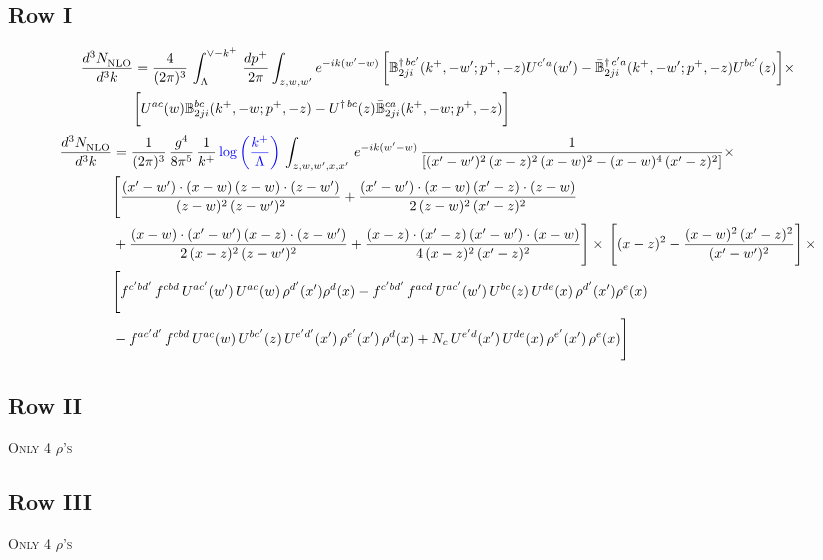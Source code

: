 \documentclass[9pt]{article}
\def\mf#1{\mathbb{#1}}
\numberwithin{equation}{section}
\begin{document}
\subsection{Row I}
\begin{align}
    \frac{d^{3}N_{\rm NLO}^{\rm}}{d^{3}k}  & = \frac{4}{(2\pi)^{3}}\,\int_{\Lambda}^{\vee-k^{+}}\, \frac{dp^{+}}{2\pi}\int_{z,w,w^{\prime}} e^{-ik(w^{\prime}-w)}\, \bigg[\mf{B}^{\dagger\, bc^{\prime}}_{2ji}(k^{+},-w^{\prime};p^{+},-z)U^{ c^{\prime}a}(w^{\prime}) -\Bar{\mf{B}}^{\dagger\, c^{\prime}a}_{2ji}(k^{+},-w^{\prime}; p^{+},-z)U^{bc^{\prime}}(z)\bigg]\times\notag \\ & \bigg[U^{ac}(w) \mf{B}^{bc}_{2ji}(k^{+},-w;p^{+},-z) -U^{\dagger\, bc}(z)\Bar{\mf{B}}^{ca}_{2ji}(k^{+},-w; p^{+},-z)\bigg]\nonumber
\end{align}
\begin{align}
 \frac{d^{3}N_{\rm NLO}^{\rm}}{d^{3}k}  & =     \frac{1}{(2\pi)^{3}}\, \frac{g^{4}}{8\pi^{5}}\,\frac{1}{k^{+}}\,{\color{blue}\log{\left(\frac{k^{+}}{\Lambda}\right)}}\,\int_{z,w,w^{\prime},x,x'}\, e^{-ik(w^{\prime}-w)}\, \frac{1}{\left[(x'-w')^{2}\,(x-z)^{2}\,(x-w)^{2} - (x-w)^{4}\, (x'-z)^{2}\right]} \times\notag \\ & \Bigg[\frac{(x'-w')\cdot (x-w)\, (z-w)\cdot (z-w')}{(z-w)^{2}\, (z-w')^{2}}+\frac{(x'-w')\cdot (x-w)\, (x'-z)\cdot (z-w)}{2\, (z-w)^{2}\, (x'-z)^{2}}\notag \\ & +\frac{(x-w)\cdot (x'-w')\, (x-z)\cdot (z-w')}{2\, (x-z)^{2}\, (z-w')^{2}}+\frac{(x-z)\cdot (x'-z)\, (x'-w')\cdot (x-w)}{4\, (x-z)^{2}\, (x'-z)^{2}}\Bigg] \times\,\Bigg[(x-z)^{2} - \frac{(x-w)^{2}\, (x'-z)^{2}}{(x'-w')^{2}}\Bigg]\,\times \notag \\ & \Bigg[f^{c'bd'}\,f^{cbd}\, U^{ac'}(w')\,U^{ac}(w)\,\rho^{d'}(x')\rho^{d}(x)- f^{c'bd'}\,f^{acd}\,U^{ac'}(w')\,U^{bc}(z)\,U^{de}(x)\,\rho^{d'}(x')\rho^{e}(x) \notag \\ & -f^{ac'd'}\,f^{cbd}\,U^{ac}(w)\,U^{bc'}(z)\,U^{e'd'}(x')\,\rho^{e'}(x')\,\rho^{d}(x) +N_{c}\,U^{e'd}(x')\,U^{de}(x)\,\rho^{e'}(x')\,\rho^{e}(x)\Bigg]
\end{align}
\subsection{Row II}
\textsc{Only 4 $\rho$'s}
\subsection{Row III}
\textsc{Only 4 $\rho$'s}
\end{document}
